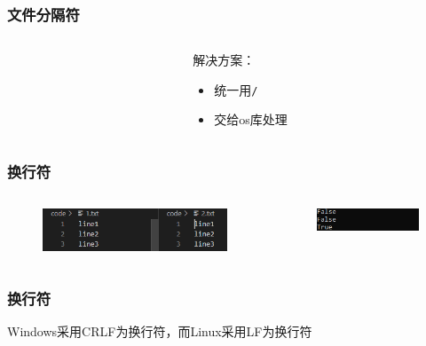 \documentclass[hyperref={pdfpagelabels=false}]{beamer}
\begin{document}
\begin{frame}
	\frametitle{文件分隔符}
	\begin{columns}
		\begin{column}{.5\linewidth}
			
		\end{column}
	
		\begin{column}{.5\linewidth}
			解决方案：
			\begin{itemize}
				\item 统一用\texttt{/}
				\item 交给os库处理
			\end{itemize}
		\end{column}
	\end{columns}
\end{frame}

\begin{frame}
	\frametitle{换行符}
	\begin{columns}
		\begin{column}{.5\linewidth}
			
			\begin{figure}
				\centering
				\includegraphics[width=\textwidth]{./figure/1.png}
			\end{figure}
		\end{column}
		\pause
		\begin{column}{.5\linewidth}
			\begin{figure}
				\centering
				\includegraphics[width=\textwidth]{./figure/2.png}
			\end{figure}
		\end{column}
	\end{columns}
\end{frame}

\begin{frame}
	\frametitle{换行符}
	Windows采用CRLF为换行符，而Linux采用LF为换行符
\end{frame}
\end{document}
